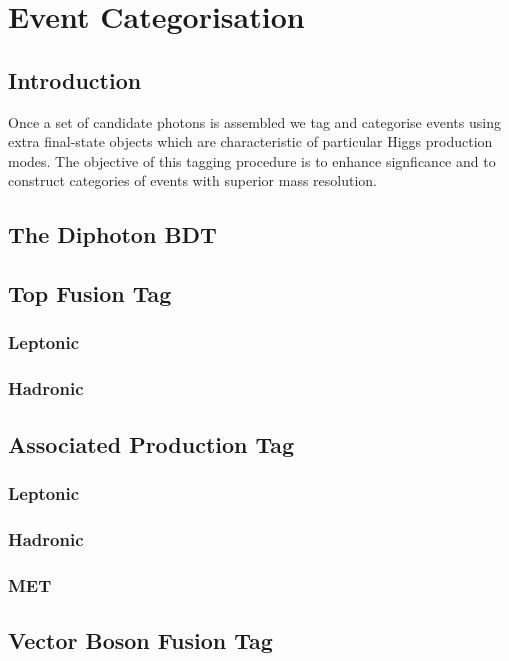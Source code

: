 \chapter{Event Categorisation}
\label{chap:event_select}

\newpage
\section{Introduction}
Once a set of candidate photons is assembled we tag and categorise events using extra final-state objects which are characteristic of particular Higgs production modes.
The objective of this tagging procedure is to enhance signficance and to construct categories of events with superior mass resolution.


\section{The Diphoton BDT}


\section{Top Fusion Tag}

\subsection{Leptonic}
\subsection{Hadronic}


\section{Associated Production Tag}

\subsection{Leptonic}
\subsection{Hadronic}
\subsection{MET}


\section{Vector Boson Fusion Tag}

